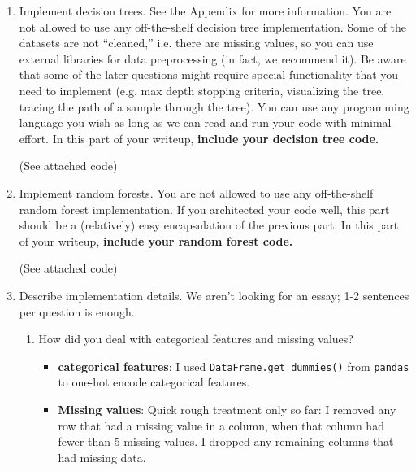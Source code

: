 \documentclass{article}
\begin{document}
\begin{enumerate}
    \item Implement decision trees. See the Appendix for more information. You are not allowed to use any off-the-shelf decision tree implementation. Some of the datasets are not “cleaned,” i.e. there are missing values, so you can use external libraries for data preprocessing (in fact, we recommend it). Be aware that some of the later questions might require special functionality that you need to implement (e.g. max depth stopping criteria, visualizing the tree, tracing the path of a sample through the tree). You can use any programming language you wish as long as we can read and run your code with minimal effort. In this part of your writeup, \textbf{include your decision tree code.}
    \begin{mdframed}
    (See attached code)
    \end{mdframed}

    \item Implement random forests. You are not allowed to use any off-the-shelf random forest implementation. If you architected your code well, this part should be a (relatively) easy encapsulation of the previous part. In this part of your writeup, \textbf{include your random forest code.}
    \begin{mdframed}
    (See attached code)
    \end{mdframed}

\newpage
    \item Describe implementation details. We aren’t looking for an essay; 1-2 sentences per question is enough.
    \begin{enumerate}
        \item How did you deal with categorical features and missing values?
        \begin{mdframed}
          \begin{itemize}
          \item \textbf{categorical features}: I used
            \texttt{DataFrame.get\_dummies()} from \texttt{pandas} to one-hot
            encode categorical features.
          \item \textbf{Missing values}: Quick rough treatment only so far: I
            removed any row that had a missing value in a column, when that
            column had fewer than 5 missing values. I dropped any remaining
            columns that had missing data.
          \end{itemize}
        \end{mdframed}


\end{enumerate}
\end{enumerate}
\end{document}
